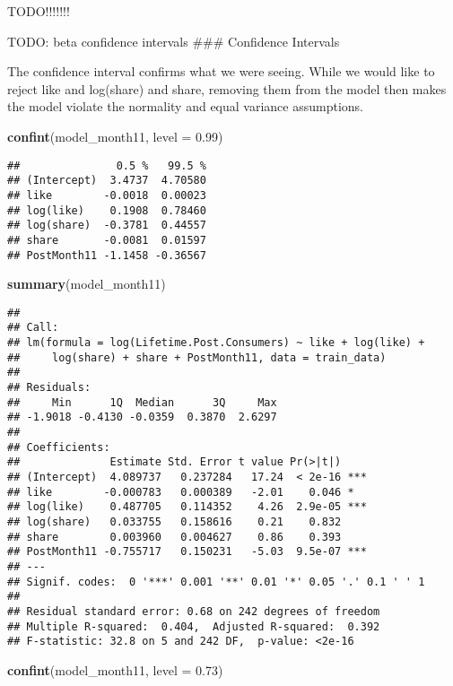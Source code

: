 \documentclass[
]{article}
\newenvironment{Shaded}{\begin{snugshade}}{\end{snugshade}}
\newcommand{\DataTypeTok}[1]{\textcolor[rgb]{0.13,0.29,0.53}{#1}}
\newcommand{\FloatTok}[1]{\textcolor[rgb]{0.00,0.00,0.81}{#1}}
\newcommand{\KeywordTok}[1]{\textcolor[rgb]{0.13,0.29,0.53}{\textbf{#1}}}
\newcommand{\NormalTok}[1]{#1}
\begin{document}
TODO!!!!!!!

TODO: beta confidence intervals \#\#\# Confidence Intervals

The confidence interval confirms what we were seeing. While we would
like to reject like and log(share) and share, removing them from the
model then makes the model violate the normality and equal variance
assumptions.

\begin{Shaded}
\begin{Highlighting}[]
\KeywordTok{confint}\NormalTok{(model_month11, }\DataTypeTok{level =} \FloatTok{0.99}\NormalTok{)}
\end{Highlighting}
\end{Shaded}

\begin{verbatim}
##               0.5 %   99.5 %
## (Intercept)  3.4737  4.70580
## like        -0.0018  0.00023
## log(like)    0.1908  0.78460
## log(share)  -0.3781  0.44557
## share       -0.0081  0.01597
## PostMonth11 -1.1458 -0.36567
\end{verbatim}

\begin{Shaded}
\begin{Highlighting}[]
\KeywordTok{summary}\NormalTok{(model_month11)}
\end{Highlighting}
\end{Shaded}

\begin{verbatim}
## 
## Call:
## lm(formula = log(Lifetime.Post.Consumers) ~ like + log(like) + 
##     log(share) + share + PostMonth11, data = train_data)
## 
## Residuals:
##     Min      1Q  Median      3Q     Max 
## -1.9018 -0.4130 -0.0359  0.3870  2.6297 
## 
## Coefficients:
##              Estimate Std. Error t value Pr(>|t|)    
## (Intercept)  4.089737   0.237284   17.24  < 2e-16 ***
## like        -0.000783   0.000389   -2.01    0.046 *  
## log(like)    0.487705   0.114352    4.26  2.9e-05 ***
## log(share)   0.033755   0.158616    0.21    0.832    
## share        0.003960   0.004627    0.86    0.393    
## PostMonth11 -0.755717   0.150231   -5.03  9.5e-07 ***
## ---
## Signif. codes:  0 '***' 0.001 '**' 0.01 '*' 0.05 '.' 0.1 ' ' 1
## 
## Residual standard error: 0.68 on 242 degrees of freedom
## Multiple R-squared:  0.404,  Adjusted R-squared:  0.392 
## F-statistic: 32.8 on 5 and 242 DF,  p-value: <2e-16
\end{verbatim}

\begin{Shaded}
\begin{Highlighting}[]
\KeywordTok{confint}\NormalTok{(model_month11, }\DataTypeTok{level =} \FloatTok{0.73}\NormalTok{)}
\end{Highlighting}
\end{Shaded}
\end{document}
